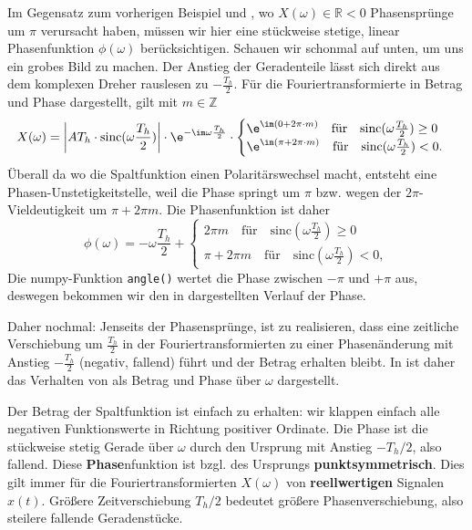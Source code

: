 \begin{Loesung}
Im Gegensatz zum vorherigen Beispiel und ,
wo $X(\omega)\in\mathbb{R}<0$ Phasensprünge um $\pi$ verursacht haben, müssen
wir hier eine stückweise stetige, linear Phasenfunktion $\phi(\omega)$ berücksichtigen.
Schauen wir schonmal auf  unten, um uns ein grobes Bild zu machen.
%
Der Anstieg der Geradenteile lässt sich direkt aus dem komplexen Dreher rauslesen
zu $-\frac{T_h}{2}$.
%
Für die Fouriertransformierte in Betrag und Phase dargestellt, gilt mit $m\in\mathbb{Z}$
\begin{equation}
X(\omega) = \bigg|A T_h \cdot \mathrm{sinc}(\omega\frac{T_h}{2})\bigg|
\cdot  \e^{-\im\omega\frac{T_h}{2}}\cdot
\begin{cases}
\e^{\im (0+2\pi \cdot m)}\quad \text{für}\quad \mathrm{sinc}(\omega\frac{T_h}{2})\geq0\\
\e^{\im (\pi + 2\pi \cdot m)}\quad \text{für}\quad\mathrm{sinc}(\omega\frac{T_h}{2})<0.
\end{cases}
\end{equation}
Überall da wo die Spaltfunktion einen Polaritärswechsel macht, entsteht
eine Phasen-Unstetigkeitstelle, weil die Phase springt um $\pi$ bzw. wegen der
$2\pi$-Vieldeutigkeit um $\pi + 2\pi m$.
%
Die Phasenfunktion ist daher
\begin{equation}
\phi(\omega) = -\omega\frac{T_h}{2} +
\begin{cases}
2\pi m\quad \text{für}\quad \mathrm{sinc}(\omega\frac{T_h}{2})\geq0\\
\pi + 2\pi m\quad \text{für}\quad\mathrm{sinc}(\omega\frac{T_h}{2})<0,
\end{cases}
\end{equation}
Die numpy-Funktion \verb|angle()| wertet die Phase zwischen $-\pi$ und $+\pi$ aus,
deswegen bekommen wir den in  dargestellten Verlauf der Phase.

Daher nochmal: Jenseits der Phasensprünge, ist zu realisieren, dass
eine zeitliche Verschiebung um $\frac{T_h}{2}$ in der Fouriertransformierten
zu einer Phasenänderung mit Anstieg $-\frac{T_h}{2}$ (negativ, fallend)
führt und der Betrag erhalten bleibt.
%
In  ist daher das Verhalten von  als
Betrag und Phase über $\omega$ dargestellt.

Der Betrag der Spaltfunktion ist einfach zu erhalten: wir klappen einfach alle
negativen Funktionswerte in Richtung positiver Ordinate.
%
Die Phase ist die stückweise stetig Gerade über $\omega$ durch den Ursprung
mit Anstieg $-T_h/2$, also fallend.
%
Diese \textbf{Phase}nfunktion ist bzgl. des Ursprungs \textbf{punktsymmetrisch}.
Dies gilt immer für die Fouriertransformierten $X(\omega)$ von \textbf{reellwertigen}
Signalen $x(t)$.
%
Größere Zeitverschiebung $T_h/2$ bedeutet größere Phasenverschiebung, also steilere
fallende Geradenstücke.


\end{Loesung}
